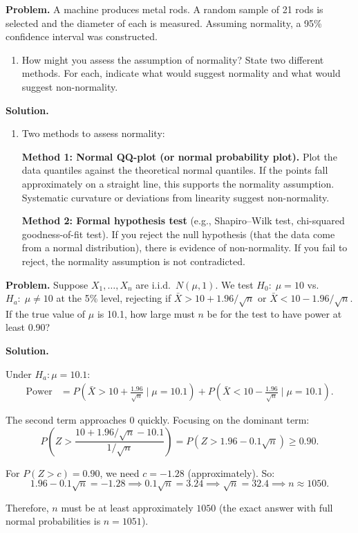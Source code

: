 \documentclass[10pt]{report}
\begin{document}
\begin{hwbox}
\textbf{Problem.} A machine produces metal rods. A random sample of 21 rods is selected and the diameter of each is measured. Assuming normality, a 95\% confidence interval was constructed.

\begin{enumerate}[label=(\alph*)]
  \item How might you assess the assumption of normality? State two different methods. For each, indicate what would suggest normality and what would suggest non-normality.
\end{enumerate}

\textbf{Solution.}

\begin{enumerate}[label=(\alph*)]
  \item Two methods to assess normality:
  
  \textbf{Method 1: Normal QQ-plot (or normal probability plot).} Plot the data quantiles against the theoretical normal quantiles. If the points fall approximately on a straight line, this supports the normality assumption. Systematic curvature or deviations from linearity suggest non-normality.
  
  \textbf{Method 2: Formal hypothesis test} (e.g., Shapiro--Wilk test, chi-squared goodness-of-fit test). If you reject the null hypothesis (that the data come from a normal distribution), there is evidence of non-normality. If you fail to reject, the normality assumption is not contradicted.
\end{enumerate}
\end{hwbox}

\begin{hwbox}
\textbf{Problem.} Suppose $X_1, \ldots, X_n$ are i.i.d.\ $N(\mu, 1)$. We test $H_0{:}\; \mu = 10$ vs.\ $H_a{:}\; \mu \neq 10$ at the 5\% level, rejecting if $\bar{X} > 10 + 1.96/\sqrt{n}$ or $\bar{X} < 10 - 1.96/\sqrt{n}$. If the true value of $\mu$ is 10.1, how large must $n$ be for the test to have power at least 0.90?

\textbf{Solution.}

Under $H_a\colon \mu = 10.1$:
\begin{align*}
\text{Power} &= P\!\left(\bar{X} > 10 + \frac{1.96}{\sqrt{n}} \;\Big|\; \mu = 10.1\right) + P\!\left(\bar{X} < 10 - \frac{1.96}{\sqrt{n}} \;\Big|\; \mu = 10.1\right).
\end{align*}

The second term approaches 0 quickly. Focusing on the dominant term:
\[
P\!\left(Z > \frac{10 + 1.96/\sqrt{n} - 10.1}{1/\sqrt{n}}\right) = P\!\left(Z > 1.96 - 0.1\sqrt{n}\right) \geq 0.90.
\]

For $P(Z > c) = 0.90$, we need $c = -1.28$ (approximately). So:
\[
1.96 - 0.1\sqrt{n} = -1.28 \implies 0.1\sqrt{n} = 3.24 \implies \sqrt{n} = 32.4 \implies n \approx 1050.
\]

Therefore, $n$ must be at least approximately $\boxed{1050}$ (the exact answer with full normal probabilities is $n = 1051$).
\end{hwbox}
\end{document}
